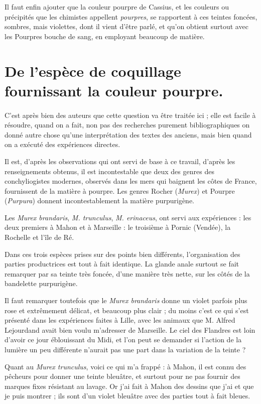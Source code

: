 \documentclass[a4paper, 11pt, oneside, polutonikogreek, french]{article}
\begin{document}
Il faut enfin ajouter que la couleur pourpre de Cassius, et les couleurs ou précipités que les chimistes appellent \emph{pourpres}, se rapportent à ces teintes foncées, sombres, mais violettes, dont il vient d'être parlé, et qu'on obtient surtout avec les Pourpres bouche de sang, en employant beaucoup de matière.
\clearpage
\section{De l'espèce de coquillage fournissant la couleur pourpre.}
\paragraph{}
C'est après bien des auteurs que cette question va être traitée ici ; elle est facile à résoudre, quand on a fait, non pas des recherches purement bibliographiques on donné autre chose qu'une interprétation des textes des anciens, mais bien quand on a exécuté des expériences directes.

Il est, d'après les observations qui ont servi de base à ce travail, d'après les renseignements obtenus, il est incontestable que deux des genres des conchyliogistes modernes, observés dans les mers qui baignent les côtes de France, fournissent de la matière à pourpre. Les genres Rocher (\emph{Murex}) et Pourpre (\emph{Purpura}) donnent incontestablement la matière purpurigène.

Les \emph{Murex brandaris}, \emph{M. trunculus}, \emph{M. erinaceus}, ont servi aux expériences : les deux premiers à Mahon et à Marseille : le troisième à Pornic (Vendée), la Rochelle et l'île de Ré.

Dans ces trois espèces prises sur des points bien différents, l'organisation des parties productrices est tout à fait identique. La glande anale surtout se fait remarquer par sa teinte très foncée, d'une manière très nette, sur les côtés de la bandelette purpurigène.

Il faut remarquer toutefois que le \emph{Murex brandaris} donne un violet parfois plus rose et extrêmement délicat, et beaucoup plus clair ; du moins c'est ce qui s'est présenté dans les expériences faites à Lille, avec les animaux que M. Alfred Lejourdand avait bien voulu m'adresser de Marseille. Le ciel des Flandres est loin d'avoir ce jour éblouissant du Midi, et l'on peut se demander si l'action de la lumière un peu différente n'aurait pas une part dans la variation de la teinte ?

Quant au \emph{Murex trunculus}, voici ce qui m'a frappé : à Mahon, il est connu des pêcheurs pour donner une teinte bleuâtre, et surtout pour ne pas fournir des marques fixes résistant au lavage. Or j'ai fait à Mahon des dessins que j'ai et que je puis montrer ; ils sont d'un violet bleuâtre avec des parties tout à fait bleues.
\end{document}
